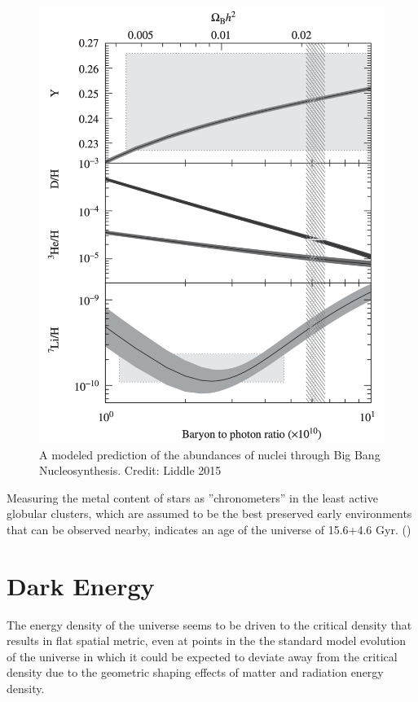 \documentclass{paper}
\begin{document}
  \begin{figure}[!htb]
    \begin{centering}
    \includegraphics[scale=0.4]{BBN-ratios.pdf}
    \caption{A modeled prediction of the abundances of nuclei through Big
      Bang Nucleosynthesis.
    Credit: Liddle 2015}
    \label{fig:DE-ratios}
    \end{centering}
  \end{figure}


  Measuring the metal content of stars as ''chronometers'' in the least active 
  globular clusters, which are assumed to be the best preserved early 
  environments that can be observed nearby, indicates an age of the universe
  of 15.6+4.6 Gyr. %
  (\cite{1999ApJ...521..194C})

\section{Dark Energy}
  The energy density of the universe seems to be driven to the critical 
  density that results in flat spatial metric, even at points in the
  the standard model evolution of the universe in which it could be expected
  to deviate away from the critical density due to the geometric shaping 
  effects of matter and radiation energy density.
\end{document}
